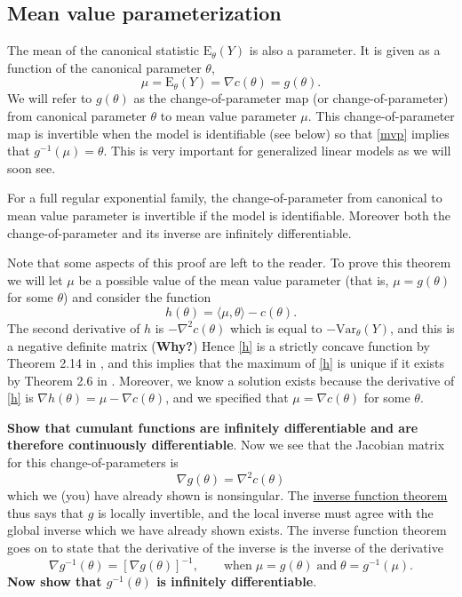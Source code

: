 \documentclass[
]{article}
\begin{document}
\hypertarget{mean-value-parameterization}{%
\subsection{Mean value
parameterization}\label{mean-value-parameterization}}

The mean of the canonical statistic \(\mathrm{E}_\theta(Y)\) is also a
parameter. It is given as a function of the canonical parameter
\(\theta\), \begin{equation} \label{mvp}
  \mu = \mathrm{E}_\theta(Y) = \nabla c(\theta) = g(\theta).
\end{equation} We will refer to \(g(\theta)\) as the change-of-parameter
map (or change-of-parameter) from canonical parameter \(\theta\) to mean
value parameter \(\mu\). This change-of-parameter map is invertible when
the model is identifiable (see below) so that \eqref{mvp} implies that
\(g^{-1}(\mu) = \theta\). This is very important for generalized linear
models as we will soon see.

\begin{thm} \label{thm-mvp}
For a full regular exponential family, the change-of-parameter from canonical to mean value parameter is invertible if the model is identifiable. Moreover both the change-of-parameter and its inverse are infinitely differentiable.
\end{thm}

Note that some aspects of this proof are left to the reader. To prove
this theorem we will let \(\mu\) be a possible value of the mean value
parameter (that is, \(\mu = g(\theta)\) for some \(\theta\)) and
consider the function \begin{equation}\label{h}
  h(\theta) = \langle \mu,\theta \rangle - c(\theta).
\end{equation} The second derivative of \(h\) is \(-\nabla^2c(\theta)\)
which is equal to \(-\mathrm{Var}_\theta(Y)\), and this is a negative
definite matrix (\textbf{Why?}) Hence \eqref{h} is a strictly concave
function by Theorem 2.14 in \cite{rockafellar2009variational}, and this
implies that the maximum of \eqref{h} is unique if it exists by Theorem
2.6 in \cite{rockafellar2009variational}. Moreover, we know a solution
exists because the derivative of \eqref{h} is
\(\nabla h(\theta) = \mu - \nabla c(\theta)\), and we specified that
\(\mu = \nabla c(\theta)\) for some \(\theta\).

\textbf{Show that cumulant functions are infinitely differentiable and are therefore continuously differentiable}.
Now we see that the Jacobian matrix for this change-of-parameters is \[
  \nabla g(\theta) = \nabla^2 c(\theta)
\] which we (you) have already shown is nonsingular. The
\href{https://en.wikipedia.org/wiki/Inverse_function_theorem}{inverse
function theorem} thus says that \(g\) is locally invertible, and the
local inverse must agree with the global inverse which we have already
shown exists. The inverse function theorem goes on to state that the
derivative of the inverse is the inverse of the derivative \[
  \nabla g^{-1}(\theta) = \left[\nabla g(\theta)\right]^{-1}, \qquad \text{when} \; \mu = g(\theta) \; \text{and} \; \theta = g^{-1}(\mu).
\] \textbf{Now show that $g^{-1}(\theta)$ is infinitely differentiable}.
\end{document}
